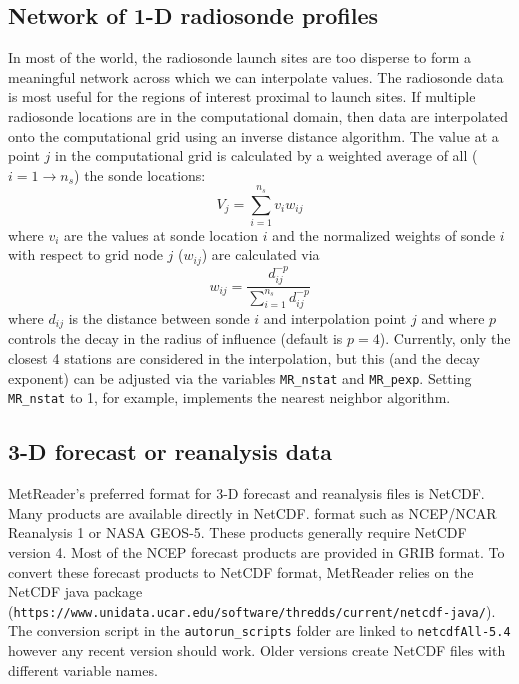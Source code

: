 \documentclass[11pt]{article}   %
\begin{document}
\subsection{Network of 1-D radiosonde profiles}
In most of the world, the radiosonde launch sites are too disperse to form
a meaningful network across which we can interpolate values.  The radiosonde
data is most useful for the regions of interest proximal to launch sites.
If multiple radiosonde locations are in the computational domain, then data
are interpolated onto the computational grid using an inverse distance
algorithm.  The value at a point $j$ in the computational grid is calculated
by a weighted average of all ($i=1\rightarrow n_s$) the sonde locations:
\begin{equation*}
V_j = \sum_{i=1}^{n_s} v_i w_{ij}
\end{equation*}
where $v_i$ are the values at sonde location $i$ and the normalized weights of
sonde $i$ with respect to grid node $j$ ($w_{ij}$) are calculated via
\begin{equation*}
w_{ij} = \frac{d_{ij}^{-p}}{\sum_{i=1}^{n_s} d_{ij}^{-p}}
\end{equation*}
where $d_{ij}$ is the distance between sonde $i$ and interpolation point $j$
and where $p$ controls
the decay in the radius of influence (default is $p=4$).  Currently, only the closest
4 stations are considered in the interpolation, but this (and the decay exponent) can
be adjusted via the variables \texttt{MR\_nstat} and \texttt{MR\_pexp}.  Setting
\texttt{MR\_nstat} to 1, for example, implements the nearest neighbor algorithm.

\subsection{3-D forecast or reanalysis data}
MetReader's preferred format for 3-D forecast and reanalysis files is NetCDF.  Many
products are available directly in NetCDF. format such as NCEP/NCAR Reanalysis 1 or
NASA GEOS-5.  These products generally require NetCDF version 4.  Most of the NCEP
forecast products are provided in GRIB format.  To convert these forecast products
to NetCDF format, MetReader relies on the NetCDF java package\\
(\texttt{https://www.unidata.ucar.edu/software/thredds/current/netcdf-java/}).  The
conversion script in the \texttt{autorun\_scripts} folder are linked to \texttt{netcdfAll-5.4}
however any recent version should work.  Older versions create NetCDF files with
different variable names.
\end{document}

